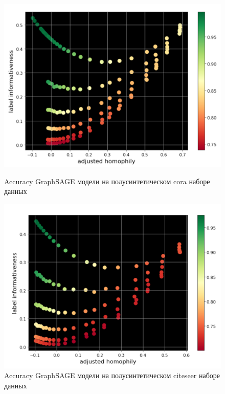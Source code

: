 \documentclass[a4paper,14pt]{article}
\begin{document}
	\begin{figure}[H]
		\centering
		\begin{minipage}[b]{0.4\textwidth}
			\includegraphics[width=\textwidth]{"images/Accuracy of GraphSAGE cora"}
			\caption{Accuracy GraphSAGE модели на полусинтетическом cora наборе данных \cite{ma2021homophily}}
			\label{fig:accuracy-of-graphsage-cora}
		\end{minipage}
		\hfill
		\begin{minipage}[b]{0.4\textwidth}
			\includegraphics[width=\textwidth]{"images/Accuracy of GraphSAGE citeseer"}
			\caption{Accuracy GraphSAGE модели на полусинтетическом citeseer наборе данных \cite{ma2021homophily}}
			\label{fig:accuracy-of-graphsage-citeseer}
		\end{minipage}
	\end{figure}
	
\end{document}
